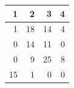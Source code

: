 \begin{tabular}{rrrr}
\toprule
1 & 2 & 3 & 4 \\
\midrule
1 & 18 & 14 & 4 \\
0 & 14 & 11 & 0 \\
0 & 9 & 25 & 8 \\
15 & 1 & 0 & 0 \\
\bottomrule
\end{tabular}
